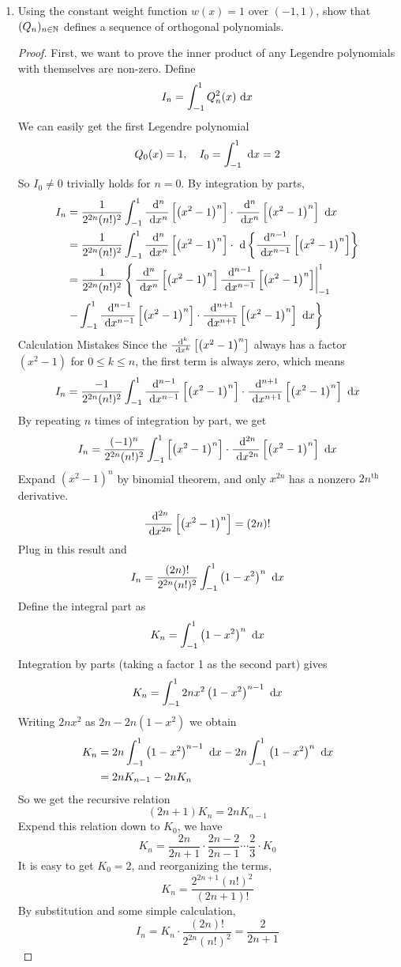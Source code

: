 \begin{enumerate}
	\item Using the constant weight function \(w(x) = 1\) over \((-1, 1)\), show that \((Q_n)_{n\in\mathbb{N}}\) defines a sequence of orthogonal polynomials.
	\begin{proof}
	First, we want to prove the inner product of any Legendre polynomials with themselves are non-zero.
	Define
	\[ I_n=\int_{-1}^{1}Q_n^2(x)~\mathrm{d} x \]
	We can easily get the first Legendre polynomial
	\[ Q_0(x)=1, \quad I_0=\int_{-1}^{1}~\mathrm{d} x=2 \]
	So \(I_0\neq0\) trivially holds for \(n=0\).
	By integration by parts,
	\begin{align*}
	I_n&=\frac{1}{2^{2n}(n!)^2} \int_{-1}^{1} \frac{~\mathrm{d}^{n}}{~\mathrm{d}{x}^{n}}\left[\left(x^2-1\right)^n \right] \cdot \frac{~\mathrm{d}^{n}}{~\mathrm{d}{x}^{n}}\left[\left(x^2-1\right)^n \right] ~\mathrm{d} x\\
	&=\frac{1}{2^{2n}(n!)^2} \int_{-1}^{1} \frac{~\mathrm{d}^{n}}{~\mathrm{d}{x}^{n}}\left[\left(x^2-1\right)^n \right] \cdot ~\mathrm{d} \left\{\frac{~\mathrm{d}^{n-1}}{~\mathrm{d}{x}^{n-1}}\left[\left(x^2-1\right)^n \right]\right\}\\
	&=\frac{1}{2^{2n}(n!)^2} \left\{ \left.\frac{~\mathrm{d}^{n}}{~\mathrm{d}{x}^{n}}\left[\left(x^2-1\right)^n \right]\frac{~\mathrm{d}^{n-1}}{~\mathrm{d}{x}^{n-1}}\left[\left(x^2-1\right)^n \right]\right|_{-1}^{1}\right. \\
	& \left. - \int_{-1}^{1} \frac{~\mathrm{d}^{n-1}}{~\mathrm{d}{x}^{n-1}}\left[\left(x^2-1\right)^n \right] \cdot \frac{~\mathrm{d}^{n+1}}{~\mathrm{d}{x}^{n+1}}\left[\left(x^2-1\right)^n \right] ~\mathrm{d} x \right\}
	\end{align*}
	{\color{red}Calculation Mistakes}
	Since the \(\frac{~\mathrm{d}^{k}}{~\mathrm{d}{x}^{k}}\left[\left(x^2-1\right)^n \right]\) always has a factor \(\left(x^2-1\right)\) for \(0\leq k\leq n\), the first term is always zero, which means
	\[ I_n=\frac{-1}{2^{2n}(n!)^2} \int_{-1}^{1} \frac{~\mathrm{d}^{n-1}}{~\mathrm{d}{x}^{n-1}}\left[\left(x^2-1\right)^n \right] \cdot \frac{~\mathrm{d}^{n+1}}{~\mathrm{d}{x}^{n+1}}\left[\left(x^2-1\right)^n \right] ~\mathrm{d} x \]
	By repeating $n$ times of integration by part, we get
	\[ I_n=\frac{(-1)^n}{2^{2n}(n!)^2} \int_{-1}^{1} \left[\left(x^2-1\right)^n \right] \cdot \frac{~\mathrm{d}^{2n}}{~\mathrm{d}{x}^{2n}}\left[\left(x^2-1\right)^n \right] ~\mathrm{d} x \]
	Expand \(\left(x^2-1\right)^n\) by binomial theorem, and only \(x^{2n}\) has a nonzero \(2n^\textrm{th}\) derivative.
	\[ \frac{~\mathrm{d}^{2n}}{~\mathrm{d}{x}^{2n}}\left[\left(x^2-1\right)^n \right]=(2n)! \]
	Plug in this result and
	\[ I_n=\frac{(2n)!}{2^{2n}(n!)^2} \int_{-1}^{1} \left(1-x^2\right)^n ~\mathrm{d} x \]
	Define the integral part as
	\[ K_n=\int_{-1}^{1} \left(1-x^2\right)^n ~\mathrm{d} x \]
	Integration by parts (taking a factor 1 as the second part) gives
	\[ K_n=\int_{-1}^{1} 2nx^2\left(1-x^2\right)^{n-1}~\mathrm{d} x \]
	Writing \(2nx^2\) as \(2n-2n\left(1-x^2\right)\) we obtain
	\begin{align*}
	K_n&=2n\int_{-1}^{1} \left(1-x^2\right)^{n-1} ~\mathrm{d} x -2n\int_{-1}^{1} \left(1-x^2\right)^n ~\mathrm{d} x\\
	&=2n K_{n-1} -2n K_{n}
	\end{align*}
	So we get the recursive relation
	\[ (2n+1)K_n = 2n K_{n-1} \]
	Expend this relation down to $K_0$, we have
	\[ K_n=\frac{2n}{2n+1}\cdot\frac{2n-2}{2n-1}\cdots\frac{2}{3}\cdot K_0 \]
	It is easy to get \(K_0=2\), and reorganizing the terms,
	\[ K_n=\frac{2^{2n+1}(n!)^2}{(2n+1)!} \]
	By substitution and some simple calculation,
	\[ I_n=K_n\cdot\frac{(2n)!}{2^{2n}(n!)^2}=\frac{2}{2n+1} \]


\end{proof}
\end{enumerate}
